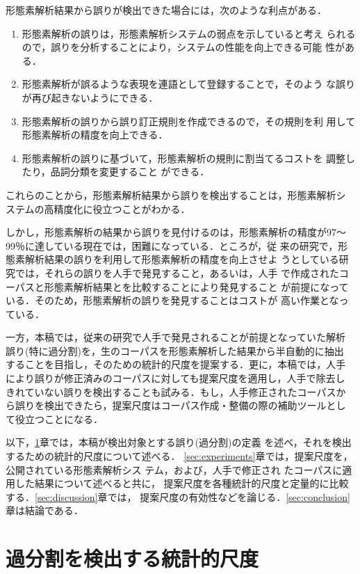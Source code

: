 形態素解析結果から誤りが検出できた場合には，次のような利点がある．
\begin{enumerate}
\item{}形態素解析の誤りは，形態素解析システムの弱点を示していると考え
  られるので，誤りを分析することにより，システムの性能を向上できる可能
  性がある．
\item{}形態素解析が誤るような表現を連語として登録することで，そのよう
  な誤りが再び起きないようにできる\cite{yamachi96,fuchi98}．
\item{}形態素解析の誤りから誤り訂正規則を作成できるので，その規則を利
  用して形態素解析の精度を向上できる\cite{yokoh97,hisamitsu98}．
\item{}形態素解析の誤りに基づいて，形態素解析の規則に割当てるコストを
  調整したり\cite{komatsu98}，品詞分類を変更する\cite{kitauchi98}こと
  ができる．
\end{enumerate}
これらのことから，形態素解析結果から誤りを検出することは，形態素解析シ
ステムの高精度化に役立つことがわかる．

しかし，形態素解析の結果から誤りを見付けるのは，形態素解析の精度が97〜
99％\cite{fuchi98}に達している現在では，困難になっている．ところが，従
来の研究で，形態素解析結果の誤りを利用して形態素解析の精度を向上させよ
うとしている研究では，それらの誤りを人手で発見すること，あるいは，人手
で作成されたコーパスと形態素解析結果とを比較することにより発見すること
が前提になっている．そのため，形態素解析の誤りを発見することはコストが
高い作業となっている．

一方，本稿では，従来の研究で人手で発見されることが前提となっていた解析
誤り(特に過分割)を，生のコーパスを形態素解析した結果から半自動的に抽出
することを目指し，そのための統計的尺度を提案する．更に，本稿では，人手
により誤りが修正済みのコーパスに対しても提案尺度を適用し，人手で除去し
きれていない誤りを検出することも試みる．もし，人手修正されたコーパスか
ら誤りを検出できたら，提案尺度はコーパス作成・整備の際の補助ツールとし
て役立つことになる．

以下，\ref{sec:measure}章では，本稿が検出対象とする誤り(過分割)の定義
を述べ，それを検出するための統計的尺度について述べる．
\ref{sec:experiments}章では，提案尺度を，公開されている形態素解析シス
テム\cite{kurohashi97,matsumoto97,washizaka97}，および，人手で修正され
たコーパス\cite{edr95,kurohashi98}に適用した結果について述べると共に，
提案尺度を各種統計的尺度と定量的に比較する．\ref{sec:discussion}章では，
提案尺度の有効性などを論じる．\ref{sec:conclusion}章は結論である．

\section{過分割を検出する統計的尺度}
\label{sec:measure}

